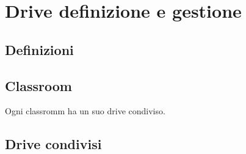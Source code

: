 
\chapter{Drive definizione e gestione}
\section{Definizioni}

\section{Classroom}
Ogni classromm  ha un suo drive condiviso.

\section{Drive condivisi}
